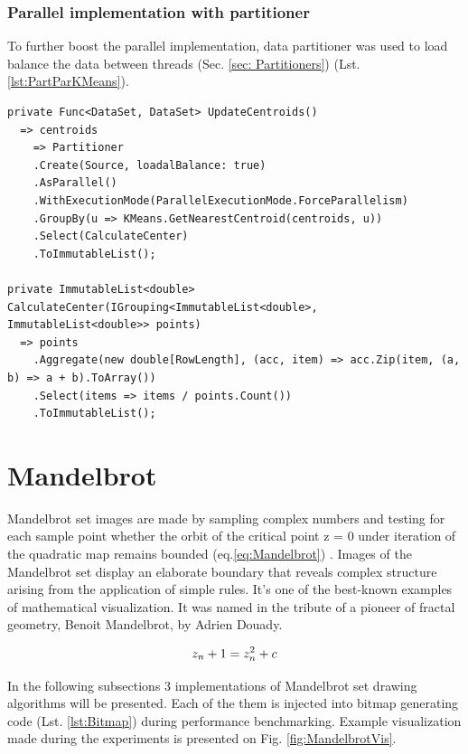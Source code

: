 \subsubsection{Parallel implementation with partitioner}

To further boost the parallel implementation, data partitioner was used to load balance the data between threads (Sec. \ref{sec: Partitioners}) (Lst. \ref{lst:PartParKMeans}). 

\begin{lstlisting}[style=sharpcstyle, caption={Parallel k-means algorithm with partitioner}, label={lst:PartParKMeans}]
private Func<DataSet, DataSet> UpdateCentroids()
  => centroids 
    => Partitioner
    .Create(Source, loadalBalance: true)
    .AsParallel()
    .WithExecutionMode(ParallelExecutionMode.ForceParallelism)
    .GroupBy(u => KMeans.GetNearestCentroid(centroids, u))
    .Select(CalculateCenter)
    .ToImmutableList();

private ImmutableList<double> CalculateCenter(IGrouping<ImmutableList<double>, ImmutableList<double>> points) 
  => points
    .Aggregate(new double[RowLength], (acc, item) => acc.Zip(item, (a, b) => a + b).ToArray())
    .Select(items => items / points.Count())
    .ToImmutableList();
\end{lstlisting}

\clearpage
\section{Mandelbrot}
\label{sec: MandelbrotImp}

Mandelbrot set images are made by sampling complex numbers and testing for each sample point whether the orbit of the critical point z = 0 under iteration of the quadratic map remains bounded (eq.\ref{eq:Mandelbrot}) \cite{MandelbrotExplorer}. Images of the Mandelbrot set display an elaborate boundary that reveals complex structure arising from the application of simple rules. It's one of the best-known examples of mathematical visualization. It was named in the tribute of a pioneer of fractal geometry, Benoit Mandelbrot, by Adrien Douady. \cite{Douady}

\begin{equation}
\centering 
z_n + 1 = z_n^2 + c
\label{eq:Mandelbrot}
\end{equation}

In the following subsections 3 implementations of Mandelbrot set drawing algorithms will be presented. Each of the them is injected into bitmap generating code (Lst. \ref{lst:Bitmap}) during performance benchmarking. Example visualization made during the experiments is presented on Fig. \ref{fig:MandelbrotVis}.

